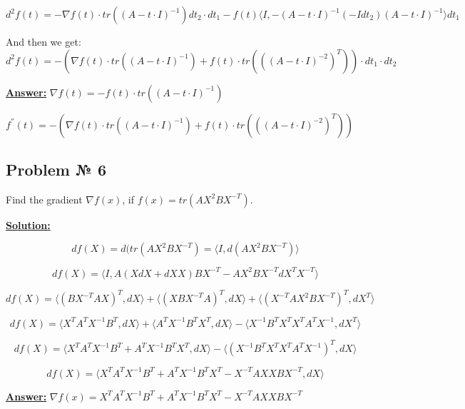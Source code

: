\begin{equation*}
    d^2f(t) = -\nabla f(t) \cdot tr \left( (A-t \cdot I)^{-1} \right)dt_2\cdot dt_1 -
    f(t) \langle I, -(A-t \cdot I)^{-1}(-Idt_2)(A-t \cdot I)^{-1} \rangle dt_1
\end{equation*}

And then we get:
\begin{equation*}
    d^2f(t) = -\left( \nabla f(t) \cdot tr\left((A-t \cdot I)^{-1}\right) + f(t)\cdot tr\left( ((A-t\cdot I)^{-2})^T\right) \right) \cdot dt_1 \cdot dt_2
\end{equation*}

\underline{\textbf{Answer:}}
$\nabla f(t) = -f(t) \cdot tr \left( (A-t \cdot I)^{-1} \right)$

$f^{''}(t) = -\left( \nabla f(t) \cdot tr\left((A-t \cdot I)^{-1}\right) + f(t)\cdot tr\left( ((A-t\cdot I)^{-2})^T\right) \right)$
 
\subsection{Problem № 6}
Find the gradient $\nabla f(x)$, if $f(x) = tr(AX^2BX^{-T})$.

\underline{\textbf{Solution:}}

\begin{equation*}
    df(X) = d(tr(AX^2BX^{-T}) = \langle I, d(AX^2BX^{-T}) \rangle
\end{equation*}

\begin{equation*}
  df(X) = \langle I, A(XdX + dXX)BX^{-T} - AX^2BX^{-T}dX^TX^{-T} \rangle 
\end{equation*}

\begin{equation*}
    df(X) = \langle (BX^{-T}AX)^T, dX \rangle + \langle (XBX^{-T}A)^T, dX \rangle  + \langle (X^{-T}AX^2BX^{-T})^T, dX^T \rangle
\end{equation*}


\begin{equation*}
    df(X) = \langle X^TA^TX^{-1}B^T, dX \rangle + \langle A^TX^{-1}B^TX^T, dX \rangle - \langle
    X^{-1}B^TX^TX^TA^TX^{-1}, dX^T \rangle
\end{equation*}


\begin{equation*}
    df(X) = \langle X^TA^TX^{-1}B^T + A^TX^{-1}B^TX^T, dX \rangle - \langle
     (X^{-1}B^TX^TX^TA^TX^{-1})^T, dX \rangle
\end{equation*}

\begin{equation*}
    df(X) = \langle X^TA^TX^{-1}B^T + A^TX^{-1}B^TX^T -
     X^{-T}AXXBX^{-T}, dX \rangle
\end{equation*}

\underline{\textbf{Answer:}} $\nabla f(x) = X^TA^TX^{-1}B^T + A^TX^{-1}B^TX^T - X^{-T}AXXBX^{-T}$


